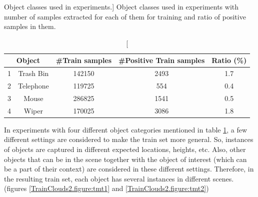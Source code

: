 \begin{table}
\centering
\caption
[Object classes used in experiments.]
{Object classes used in experiments with number of samples extracted for each of them for training and ratio of positive samples in them.}
\label{Objects.table}
\begin{tabular}{|c|c|c|c|c|}
\hline
\multicolumn{2}{|c|}{Object} & \#Train samples & \#Positive Train samples & Ratio (\%) \\
\hline
      1 & Trash Bin & 142150 & 2493 & 1.7 \\
\hline
      2 & Telephone   & 119725 & 554  & 0.4 \\
\hline
      3 & Mouse     & 286825 & 1541 & 0.5 \\
\hline
      4 & Wiper     & 170025 & 3086 & 1.8 \\
\hline

\end{tabular}
\end{table}


In experiments with four different object categories mentioned in table \ref{Objects.table}, a few different settings are considered to make the train set more general. So, instances of objects are captured in different expected locations, heights, etc. Also, other objects that can be in the scene together with the object of interest (which can be a part of their context) are considered in these different settings. Therefore, in the resulting train set, each object has several instances in different scenes.
(figures \ref{TrainClouds2.figure:tmt1} and \ref{TrainClouds2.figure:tmt2})

